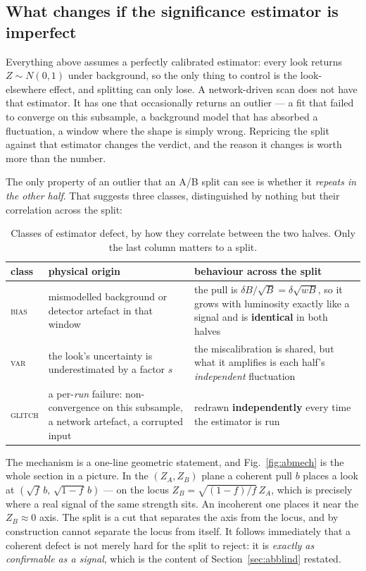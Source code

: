 \subsection{What changes if the significance estimator is imperfect}
\label{sec:abnoise}

Everything above assumes a perfectly calibrated estimator: every look returns $Z \sim N(0,1)$
under background, so the only thing to control is the look-elsewhere effect, and splitting can
only lose. A network-driven scan does not have that estimator. It has one that occasionally
returns an outlier --- a fit that failed to converge on this subsample, a background model that
has absorbed a fluctuation, a window where the shape is simply wrong. Repricing the split against
that estimator changes the verdict, and the reason it changes is worth more than the number.

The only property of an outlier that an A/B split can see is whether it \emph{repeats in the other
half}. That suggests three classes, distinguished by nothing but their correlation across the
split:

\begin{table}[htbp]
\centering
\caption{Classes of estimator defect, by how they correlate between the two halves. Only the last
column matters to a split.}
\label{tab:abdefect}
\begin{tabular}{lp{4.5cm}p{5.4cm}}
\toprule
class & physical origin & behaviour across the split \\
\midrule
\textsc{bias} & mismodelled background or detector artefact in that window &
  the pull is $\delta B/\sqrt{B} = \delta\sqrt{wB}$, so it grows with luminosity exactly like a
  signal and is \textbf{identical} in both halves \\
\textsc{var} & the look's uncertainty is underestimated by a factor $s$ &
  the miscalibration is shared, but what it amplifies is each half's \emph{independent}
  fluctuation \\
\textsc{glitch} & a per-\emph{run} failure: non-convergence on this subsample, a network
  artefact, a corrupted input &
  redrawn \textbf{independently} every time the estimator is run \\
\bottomrule
\end{tabular}
\end{table}

The mechanism is a one-line geometric statement, and Fig.~\ref{fig:abmech} is the whole section in
a picture. In the $(Z_A, Z_B)$ plane a coherent pull $b$ places a look at
$(\sqrt{f}\,b,\,\sqrt{1-f}\,b)$ --- on the locus $Z_B = \sqrt{(1-f)/f}\,Z_A$, which is precisely
where a real signal of the same strength sits. An incoherent one places it near the $Z_B \approx 0$
axis. The split is a cut that separates the axis from the locus, and by construction cannot
separate the locus from itself. It follows immediately that a coherent defect is not merely hard
for the split to reject: it is \emph{exactly as confirmable as a signal}, which is the content of
Section~\ref{sec:abblind} restated.

